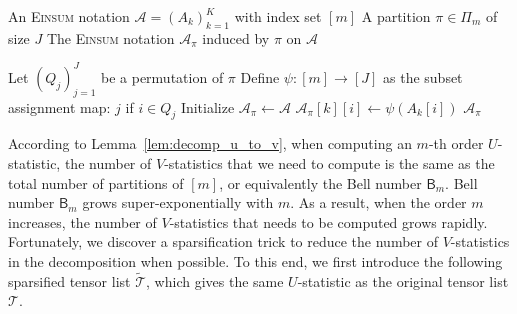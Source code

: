 \documentclass[twoside,11pt]{article}
\def\tilde{\widetilde}
\newcommand{\Lin}[1]{{\color{purple}{Lin: #1}}}
\newcommand{\Zhang}[1]{{\color{blue}{Zhang: #1}}}
\def\Einsum{\textsc{Einsum}}
\def\tilde{\widetilde}
\newcommand{\sPi}{\pi}
\newcommand{\partition}{\Pi}
\newcommand{\partitionp}[1]{\partition_{#1}}
\def\calA{\mathcal{A}}
\def\calT{\mathcal{T}}
\begin{document}
\begin{algorithm}
    \caption{Induced \Einsum{} Notation via Partition}
    \label{alg:induced_expression}
    \begin{algorithmic}[1]
        \Require 
        \Statex An \Einsum{} notation $\calA = (A_k)_{k=1}^K$ with index set $[m]$ 
        \Statex A partition $\sPi \in \partitionp{m}$ of size $J$
        \Ensure The \Einsum{} notation $\calA_\sPi$ induced by $\sPi$ on $\calA$

        \Function{InducedNotation}{$\calA; \sPi$}
            \State Let $(Q_j)_{j=1}^J$ be a permutation of $\sPi$
            \State Define $\psi \colon [m] \to [J]$ as the subset assignment map:
                \State \Return $j$ if $i \in Q_j$ 
            \EndFunction
            \State Initialize $\calA_\sPi \gets \calA$
                    \State $\calA_\sPi[k][i] \gets \psi(A_k[i])$
                \EndFor
            \EndFor
            \State \Return $\calA_\sPi$
        \EndFunction
    \end{algorithmic}
\end{algorithm}

According to Lemma~\ref{lem:decomp_u_to_v}, when computing an $m$-th order $U$-statistic, the number of $V$-statistics that we need to compute is the same as the total number of partitions of $[m]$, or equivalently the Bell number $\mathsf{B}_m$. Bell number $\mathsf{B}_m$ grows super-exponentially with $m$. %
As a result, when the order $m$ increases, the number of $V$-statistics that needs to be computed grows rapidly. Fortunately, we discover a sparsification trick to reduce the number of $V$-statistics in the decomposition when possible. To this end, we first introduce the following sparsified tensor list $\tilde{\calT}$, which gives the same $U$-statistic as the original tensor list $\calT$.
\end{document}
